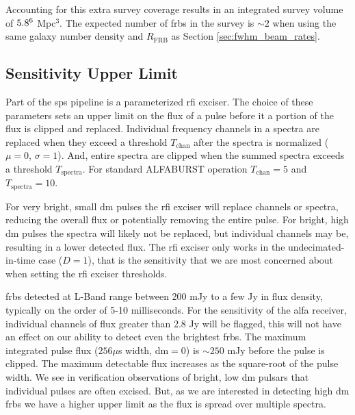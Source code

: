 \documentclass[a4paper,fleqn,usenatbib]{mnras}
\begin{document}
Accounting for this extra survey coverage results in an integrated survey volume
of $5.8 \time 10^6$ Mpc$^3$. The expected number of \glspl{frb} in the survey is
$\sim 2$ when using the same galaxy number density and $R_{\textrm{FRB}}$ as
Section \ref{sec:fwhm_beam_rates}.

\subsection{Sensitivity Upper Limit}
\label{sec:upper_limit}

Part of the \gls{sps} pipeline is a parameterized \gls{rfi} exciser. The choice
of these parameters sets an upper limit on the flux of a pulse before it a
portion of the flux is clipped and replaced. Individual frequency channels in a
spectra are replaced when they exceed a threshold $T_{\textrm{chan}}$ after the
spectra is normalized ($\mu=0$, $\sigma=1$). And, entire spectra are clipped
when the summed spectra exceeds a threshold $T_{\textrm{spectra}}$. For standard
ALFABURST operation $T_{\textrm{chan}} = 5$ and $T_{\textrm{spectra}} = 10$.

For very bright, small \gls{dm} pulses the \gls{rfi} exciser will replace
channels or spectra, reducing the overall flux or potentially removing the
entire pulse.  For bright, high \gls{dm} pulses the spectra will likely not be
replaced, but individual channels may be, resulting in a lower detected flux.
The \gls{rfi} exciser only works in the undecimated-in-time case ($D=1$), that
is the sensitivity that we are most concerned about when setting the \gls{rfi}
exciser thresholds.

\glspl{frb} detected at L-Band range between 200 mJy to a few Jy in flux
density, typically on the order of 5-10 milliseconds. For the sensitivity of the
\gls{alfa} receiver, individual channels of flux greater than 2.8 Jy will be
flagged, this will not have an effect on our ability to detect even the
brightest \glspl{frb}.  The maximum integrated pulse flux ($256 \mu$s width,
\gls{dm}$=0$) is $\sim250$ mJy before the pulse is clipped. The maximum
detectable flux increases as the square-root of the pulse width.  We see in
verification observations of bright, low \gls{dm} pulsars that individual
pulses are often excised. But, as we are interested in detecting high \gls{dm}
\glspl{frb} we have a higher upper limit as the flux is spread over multiple
spectra.
\end{document}

